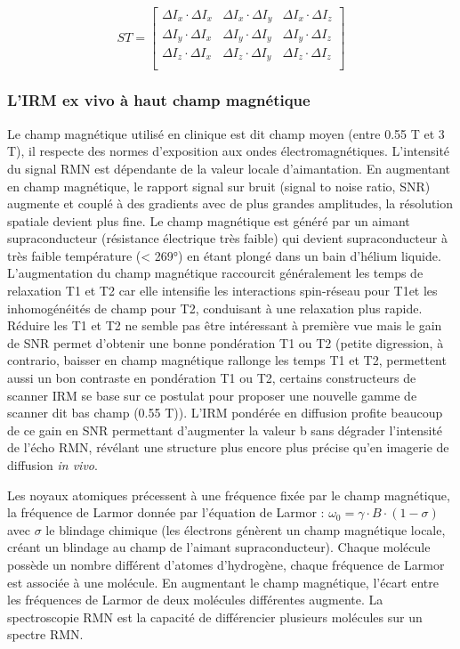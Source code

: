 \begin{equation}
\nonumber
ST =
\begin{bmatrix}
\Delta I_x \cdot \Delta I_x & \Delta I_x \cdot \Delta I_y & \Delta I_x \cdot \Delta I_z\\
\Delta I_y \cdot \Delta I_x & \Delta I_y \cdot \Delta I_y & \Delta I_y \cdot \Delta I_z\\
\Delta I_z \cdot \Delta I_x & \Delta I_z \cdot \Delta I_y & \Delta I_z \cdot \Delta I_z\\
\end{bmatrix}
\end{equation}

\subsubsection{L’IRM ex vivo à haut champ magnétique}

Le champ magnétique utilisé en clinique est dit champ moyen (entre 0.55 T et 3 T), il respecte des normes d’exposition aux ondes électromagnétiques. L’intensité du signal RMN est dépendante de la valeur locale d’aimantation. En augmentant en champ magnétique, le rapport signal sur bruit (signal to noise ratio, SNR) augmente et couplé à des gradients avec de plus grandes amplitudes, la résolution spatiale devient plus fine. Le champ magnétique est généré par un aimant supraconducteur (résistance électrique très faible) qui devient supraconducteur à très faible température (< 269°) en étant plongé dans un bain d’hélium liquide. L'augmentation du champ magnétique raccourcit généralement les temps de relaxation T1 et T2 car elle intensifie les interactions spin-réseau pour T1et les inhomogénéités de champ pour T2, conduisant à une relaxation plus rapide.  Réduire les T1 et T2 ne semble pas être intéressant à première vue mais le gain de SNR permet d’obtenir une bonne pondération T1 ou T2 (petite digression, à contrario, baisser en champ magnétique rallonge les temps T1 et T2, permettent aussi un bon contraste en pondération T1 ou T2, certains constructeurs de scanner IRM se base sur ce postulat pour proposer une nouvelle gamme de scanner dit bas champ (0.55 T)).
L’IRM pondérée en diffusion profite beaucoup de ce gain en SNR permettant d’augmenter la valeur b sans dégrader l’intensité de l’écho RMN, révélant une structure plus encore plus précise qu’en imagerie de diffusion \textit{in vivo}.

Les noyaux atomiques précessent à une fréquence fixée par le champ magnétique, la fréquence de Larmor donnée par l’équation de Larmor : $\omega_0=\gamma \cdot B \cdot (1-\sigma)$ avec $\sigma$ le blindage chimique (les électrons génèrent un champ magnétique locale, créant un blindage au champ de l’aimant supraconducteur). Chaque molécule possède un nombre différent d’atomes d’hydrogène, chaque fréquence de Larmor est associée à une molécule. En augmentant le champ magnétique, l’écart entre les fréquences de Larmor de deux molécules différentes augmente.  La spectroscopie RMN est la capacité de différencier plusieurs molécules sur un spectre RMN.

